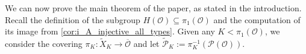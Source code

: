 \documentclass{amsart}
\newtheorem{proposition}[theorem]{Proposition}
\theoremstyle{definition}
\newtheorem{definition}[theorem]{Definition}
\DeclareMathOperator{\reg}{reg}
\newcommand{\cP}{\mathcal{P}}
\newcommand{\cS}{\mathcal{S}}
\newcommand{\m}{\mathrm{m}}
\newcommand{\g}{\mathfrak{g}}
\newcommand{\Ab}{\bar{A}}
\newcommand{\0}{\mathcal{O}}
\begin{document}












We can now prove the main theorem of the paper, as stated in the introduction.
Recall the definition of the subgroup $H(\0) \subseteq \pi_1(\0)$ and 
the computation of its image from \cref{cor:i_A_injective_all_types}.  Given any $K < \pi_1(\0)$, we consider the 
covering $\pi_K: \widetilde{X}_K \to \overline{\0}$ and let $\widetilde{\mathcal P}_K := \pi_K^{-1} (\cP(\0))$.

\end{document}
